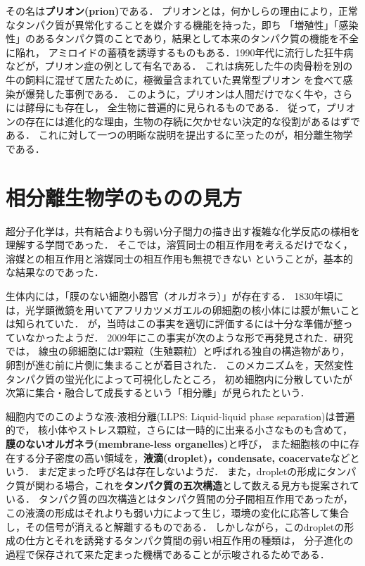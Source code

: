 \documentclass[uplatex,dvipdfmx]{jsarticle}
\begin{document}
その名は\textbf{プリオン(prion)}である．
プリオンとは，何かしらの理由により，正常なタンパク質が異常化することを媒介する機能を持った，即ち
「増殖性」「感染性」のあるタンパク質のことであり，結果として本来のタンパク質の機能を不全に陥れ，
アミロイドの蓄積を誘導するものもある．1990年代に流行した狂牛病などが，プリオン症の例として有名である．
これは病死した牛の肉骨粉を別の牛の飼料に混ぜて居たために，極微量含まれていた異常型プリオン
を食べて感染が爆発した事例である．
このように，プリオンは人間だけでなく牛や，さらには酵母にも存在し，
全生物に普遍的に見られるものである．
従って，プリオンの存在には進化的な理由，生物の存続に欠かせない決定的な役割があるはずである．
これに対して一つの明晰な説明を提出するに至ったのが，相分離生物学である．

\section{相分離生物学のものの見方}

超分子化学は，共有結合よりも弱い分子間力の描き出す複雑な化学反応の様相を理解する学問であった．
そこでは，溶質同士の相互作用を考えるだけでなく，溶媒との相互作用と溶媒同士の相互作用も無視できない
ということが，基本的な結果なのであった．

生体内には，「膜のない細胞小器官（オルガネラ）」が存在する．
1830年頃には，光学顕微鏡を用いてアフリカツメガエルの卵細胞の核小体には膜が無いことは知られていた．
が，当時はこの事実を適切に評価するには十分な準備が整っていなかったようだ．
2009年にこの事実が次のような形で再発見された．研究\cite{Clifford Brangwynne Anthony Hyman 09 Science}では，
線虫の卵細胞にはP顆粒（生殖顆粒）と呼ばれる独自の構造物があり，
卵割が進む前に片側に集まることが着目された．
このメカニズムを，天然変性タンパク質の蛍光化によって可視化したところ，
初め細胞内に分散していたが次第に集合・融合して成長するという「相分離」が見られたという．

細胞内でのこのような液-液相分離(LLPS: Liquid-liquid phase separation)は普遍的で，
核小体やストレス顆粒，さらには一時的に出来る小さなものも含めて，\textbf{膜のないオルガネラ(membrane-less organelles)}と呼び，
また細胞核の中に存在する分子密度の高い領域を，\textbf{液滴(droplet)，condensate, coacervate}などという．
まだ定まった呼び名は存在しないようだ．
また，dropletの形成にタンパク質が関わる場合，これを\textbf{タンパク質の五次構造}として数える見方も提案されている．
タンパク質の四次構造とはタンパク質間の分子間相互作用であったが，
この液滴の形成はそれよりも弱い力によって生じ，環境の変化に応答して集合し，その信号が消えると解離するものである．
しかしながら，このdropletの形成の仕方とそれを誘発するタンパク質間の弱い相互作用の種類は，
分子進化の過程で保存されて来た定まった機構であることが示唆されるためである\cite{Molecular Evolution}．
\end{document}
